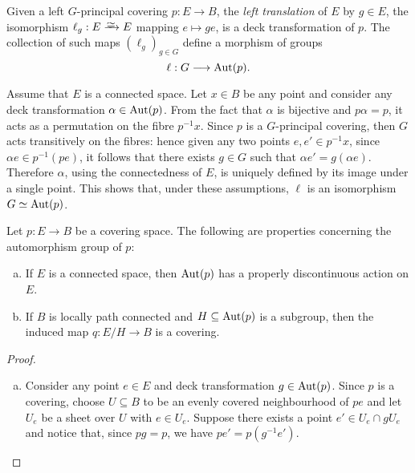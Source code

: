 \begin{example}[Translations]
\label{exp:left-translation-is-deck-transformation}
Given a left \(G\)-principal covering \(p: E \to B\), the \emph{left
  translation} of \(E\) by \(g \in E\), the isomorphism \(\ell_g: E \isoto E\)
mapping \(e \mapsto g e\), is a deck transformation of \(p\). The collection of
such maps \((\ell_g)_{g \in G}\) define a morphism of groups
\[
\ell: G \longrightarrow \operatorname{Aut}(p).
\]

Assume that \(E\) is a connected space. Let \(x \in B\) be any point and
consider any deck transformation \(\alpha \in \operatorname{Aut}(p)\). From the fact that
\(\alpha\) is bijective and \(p \alpha = p\), it acts as a permutation on the
fibre \(p^{-1} x\). Since \(p\) is a \(G\)-principal covering, then \(G\) acts
transitively on the fibres: hence given any two points \(e, e' \in p^{-1} x\),
since \(\alpha e \in p^{-1}(p e)\), it follows that there exists \(g \in G\)
such that \(\alpha e' = g(\alpha e)\). Therefore \(\alpha\), using the
connectedness of \(E\), is uniquely defined by its image under a single
point. This shows that, under these assumptions, \(\ell\) is an isomorphism
\(G \simeq \operatorname{Aut}(p)\).
\end{example}

\begin{proposition}
\label{prop:automorphism-grp-covering-properties}
Let \(p: E \to B\) be a covering space. The following are properties concerning
the automorphism group of \(p\):
\begin{enumerate}[(a)]\setlength\itemsep{0em}
\item If \(E\) is a connected space, then \(\operatorname{Aut}(p)\) has a properly
  discontinuous action on \(E\).

\item If \(B\) is locally path connected and \(H \subseteq \operatorname{Aut}(p)\) is a
  subgroup, then the induced map \(q: E/H \to B\) is a covering.
\end{enumerate}
\end{proposition}

\begin{proof}
\begin{enumerate}[(a)]\setlength\itemsep{0em}
\item Consider any point \(e \in E\) and deck transformation \(g \in
  \operatorname{Aut}(p)\). Since \(p\) is a covering, choose \(U \subseteq B\) to be an evenly
  covered neighbourhood of \(p e\) and let \(U_e\) be a sheet over \(U\) with
  \(e \in U_e\). Suppose there exists a point \(e' \in U_e \cap g U_e\) and
  notice that, since \(p g = p\), we have \(p e' = p(g^{-1} e')\).

\end{enumerate}
\end{proof}

